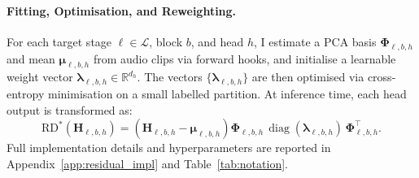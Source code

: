 \paragraph{Fitting, Optimisation, and Reweighting.}
For each target stage $\ell \in \mathcal{L}$, block $b$, and head $h$, 
I estimate a PCA basis $\boldsymbol{\Phi}_{\ell,b,h}$ and mean 
$\boldsymbol{\mu}_{\ell,b,h}$ from audio clips via forward hooks, 
and initialise a learnable weight vector 
$\boldsymbol{\lambda}_{\ell,b,h} \in \mathbb{R}^{d_h}$.
The vectors $\{\boldsymbol{\lambda}_{\ell,b,h}\}$ are then optimised 
via cross-entropy minimisation on a small labelled partition.
At inference time, each head output is transformed as:
\begin{equation*}
    \mathrm{RD}^*\!\left(\mathbf{H}_{\ell,b,h}\right)
=
\left(\mathbf{H}_{\ell,b,h} - \boldsymbol{\mu}_{\ell,b,h}\right)
\boldsymbol{\Phi}_{\ell,b,h}\,
\operatorname{diag}(\boldsymbol{\lambda}_{\ell,b,h})\,
\boldsymbol{\Phi}_{\ell,b,h}^\top.
\end{equation*}
Full implementation details and hyperparameters are reported 
in Appendix~\ref{app:residual_impl} and Table~\ref{tab:notation}.